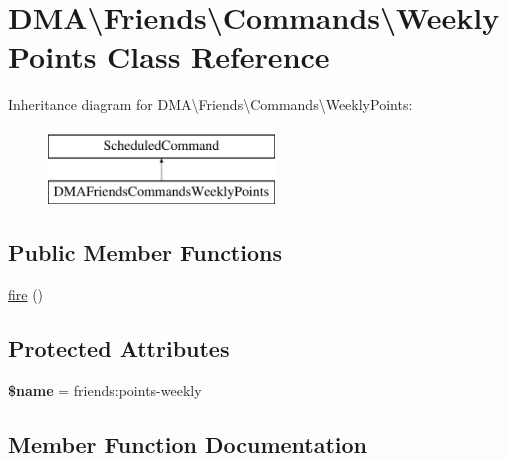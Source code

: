 \hypertarget{classDMA_1_1Friends_1_1Commands_1_1WeeklyPoints}{}\section{D\+M\+A\textbackslash{}Friends\textbackslash{}Commands\textbackslash{}Weekly\+Points Class Reference}
\label{classDMA_1_1Friends_1_1Commands_1_1WeeklyPoints}
Inheritance diagram for D\+M\+A\textbackslash{}Friends\textbackslash{}Commands\textbackslash{}Weekly\+Points\+:\begin{figure}[H]
\begin{center}
\leavevmode
\includegraphics[height=2.000000cm]{d5/d03/classDMA_1_1Friends_1_1Commands_1_1WeeklyPoints}
\end{center}
\end{figure}
\subsection*{Public Member Functions}
\begin{DoxyCompactItemize}
\item 
\hyperlink{classDMA_1_1Friends_1_1Commands_1_1WeeklyPoints_a3fb80cfeb37ba525e9b24e7362e35daf}{fire} ()
\end{DoxyCompactItemize}
\subsection*{Protected Attributes}
\begin{DoxyCompactItemize}
\item 
\hypertarget{classDMA_1_1Friends_1_1Commands_1_1WeeklyPoints_a246f543fbe9edae766eb00112beacf2c}{}{\bfseries \$name} = \textquotesingle{}friends\+:points-\/weekly\textquotesingle{}\label{classDMA_1_1Friends_1_1Commands_1_1WeeklyPoints_a246f543fbe9edae766eb00112beacf2c}

\end{DoxyCompactItemize}


\subsection{Member Function Documentation}
\hypertarget{classDMA_1_1Friends_1_1Commands_1_1WeeklyPoints_a3fb80cfeb37ba525e9b24e7362e35daf}{}
